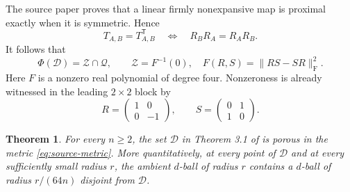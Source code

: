 \documentclass[11pt]{article}
\newtheorem{theorem}{Theorem}
\newcommand{\Frob}{\mathrm F}
\newcommand{\Dset}{\mathcal D}
\newcommand{\Qset}{\mathcal Q}
\newcommand{\Zset}{\mathcal Z}
\begin{document}
The source paper proves that a linear firmly nonexpansive map is proximal
exactly when it is symmetric.  Hence
\[
 T_{A,B}=T_{A,B}^{\mathsf T}
 \quad\Longleftrightarrow\quad
 R_BR_A=R_AR_B.
\]
It follows that
\begin{equation}\label{eq:commuting}
 \Phi(\Dset)=\Zset\cap\Qset,
 \qquad
 \Zset=F^{-1}(0),\quad
 F(R,S)=\|RS-SR\|_{\Frob}^2.
\end{equation}
Here $F$ is a nonzero real polynomial of degree four.  Nonzeroness is already
witnessed in the leading $2\times2$ block by
\[
 R=\begin{pmatrix}1&0\\0&-1\end{pmatrix},\qquad
 S=\begin{pmatrix}0&1\\1&0\end{pmatrix}.
\]

\begin{theorem}\label{thm:main}
For every $n\ge2$, the set $\Dset$ in Theorem 3.1 of \cite{BSW} is porous
in the metric \eqref{eq:source-metric}.  More quantitatively, at every point
of $\Dset$ and at every sufficiently small radius $r$, the ambient
$d$-ball of radius $r$ contains a $d$-ball of radius $r/(64n)$ disjoint from
$\Dset$.
\end{theorem}
\end{document}
